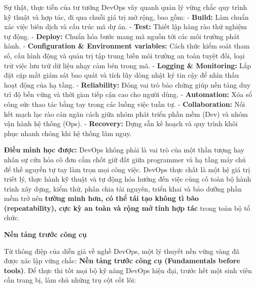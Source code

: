Sự thật, thực tiễn của tư tưởng DevOps vây quanh quản lý vững chắc quy
trình kỹ thuật và hợp tác, đi qua chuỗi giá trị mở rộng, bao gồm: -
\textbf{Build:} Làm chuẩn xác việc biên dịch và cấu trúc mã dự án. -
\textbf{Test:} Thiết lập hàng rào thử nghiệm tự động. - \textbf{Deploy:}
Chuẩn hóa bước mang mã nguồn tới các môi trường phát hành. -
\textbf{Configuration \& Environment variables:} Cách thức kiểm soát
tham số, cấu hình động và quản trị tập trung biến môi trường an toàn
tuyệt đối, loại trừ việc lưu trữ dữ liệu nhạy cảm bên trong mã. -
\textbf{Logging \& Monitoring:} Lắp đặt cặp mắt giám sát bao quát và
tích lũy dòng nhật ký tin cậy để nhìn thấu hoạt động của hạ tầng. -
\textbf{Reliability:} Đóng vai trò bảo chứng giúp nền tảng duy trì độ
bền vững và thời gian tiếp cận cao cho người dùng. -
\textbf{Automation:} Xóa sổ công sức thao tác bằng tay trong các luồng
việc tuần tự. - \textbf{Collaboration:} Nối kết mạch lạc rào cản ngăn
cách giữa nhóm phát triển phần mềm (Dev) và nhóm vận hành hệ thống
(Ops). - \textbf{Recovery:} Dựng sẵn kế hoạch và quy trình khôi phục
nhanh chóng khi hệ thống lâm nguy.

\textbf{Điều mình học được:} DevOps không phải là vai trò của một thần
tượng hay nhân sự cứu hỏa cô đơn cắm chốt giữ đất giữa programmer và hạ
tầng máy chủ để thề nguyền tự tay làm trọn mọi công việc. DevOps thực
chất là một hệ giá trị triết lý, thực hành kỹ thuật và tự động hóa hướng
đến việc củng cố toàn bộ hành trình xây dựng, kiểm thử, phân chia tài
nguyên, triển khai và bảo dưỡng phần mềm trở nên \textbf{tường minh hơn,
có thể tái tạo không tì bão (repeatability), cực kỳ an toàn và rộng mở
tính hợp tác} trong toàn bộ tổ chức.

\vspace{0.5em}\noindent\textbf{Nền tảng trước công
cụ}\par

Từ thông điệp của diễn giả về nghề DevOps, một lý thuyết nền vững vàng
đã được xác lập vững chắc: \textbf{Nền tảng trước công cụ (Fundamentals
before tools)}. Để thực thi tốt mọi bộ kỹ năng DevOps hiện đại, trước
hết một sinh viên cần trang bị, làm chủ những trụ cột cốt lõi:

